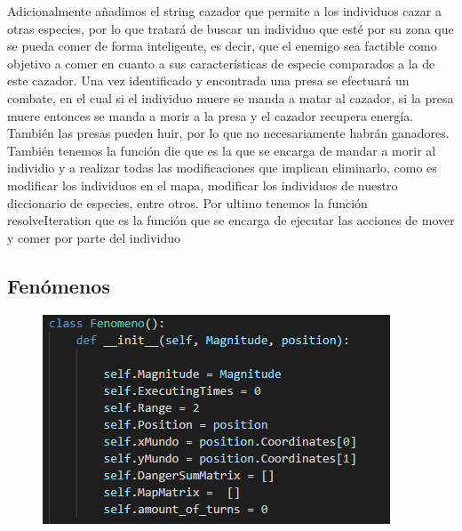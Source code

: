 \documentclass{llncs}
\begin{document}
\newline
Adicionalmente añadimos el string cazador que permite a los individuos cazar a otras especies, por lo que tratará de buscar un individuo que esté por su zona que se pueda comer de forma inteligente, es decir, que el enemigo sea factible como objetivo a comer en cuanto a sus características de especie comparados a la de este cazador.
\newline
Una vez identificado y encontrada una presa se efectuará un combate, en el cual si el individuo muere se manda a matar al cazador, si la presa muere entonces se manda a morir a la presa y el cazador recupera energía. También las presas pueden huir, por lo que no necesariamente habrán ganadores.
\newline
\newline
También tenemos la función die que es la que se encarga de mandar a morir al individio y a realizar todas las modificaciones que implican eliminarlo, como es modificar los individuos en el mapa, modificar los individuos de nuestro diccionario de especies, entre otros.
\newline
\newline
Por ultimo tenemos la función resolveIteration que es la función que se encarga de ejecutar las acciones de mover y comer por parte del individuo
 

\subsection{Fenómenos}
\begin{figure}
	\centering
	\includegraphics[width=0.7\linewidth]{imagenes/fenomeno}
	\label{fig:fenomeno}
\end{figure}
\end{document}
